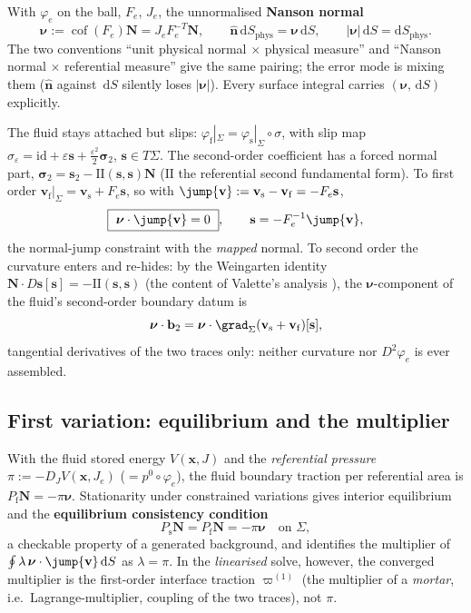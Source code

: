 \documentclass[11pt]{article}
\numberwithin{equation}{section}
\theoremstyle{remark}
\newcommand{\eps}{\varepsilon}
\newcommand{\dS}{\,\mathrm{d}S}
\newcommand{\cof}{\operatorname{cof}}
\newcommand{\vv}{\mathbf{v}}
\newcommand{\vn}{\hat{\mathbf{n}}}
\newcommand{\vN}{\mathbf{N}}
\newcommand{\vs}{\mathbf{s}}
\newcommand{\vx}{\mathbf{x}}
\newcommand{\bnu}{\bm{\nu}}
\begin{document}
With $\varphi_e$ on the ball, $F_e$, $J_e$, the unnormalised \textbf{Nanson
normal}
\begin{equation}
  \bnu := \cof(F_e)\vN = J_eF_e^{-T}\vN, \qquad
  \vn\,\mathrm{d}S_{\mathrm{phys}} = \bnu\dS, \qquad
  |\bnu|\dS = \mathrm{d}S_{\mathrm{phys}} .
\end{equation}
The two conventions ``unit physical normal $\times$ physical measure'' and
``Nanson normal $\times$ referential measure'' give the same pairing; the
error mode is mixing them ($\vn$ against $\dS$ silently loses $|\bnu|$).
Every surface integral carries $(\bnu,\dS)$ explicitly.

The fluid stays attached but slips: $\varphi_{\mathrm{f}}|_\Sigma =
\varphi_{\mathrm{s}}|_\Sigma\circ\sigma$, with slip map $\sigma_\eps =
\mathrm{id} + \eps\vs + \tfrac{\eps^2}{2}\bm{\sigma}_2$, $\vs\in T\Sigma$.
The second-order coefficient has a forced normal part,
$\bm{\sigma}_2 = \vs_2 - \mathrm{II}(\vs,\vs)\vN$ ($\mathrm{II}$ the
referential second fundamental form). To first order $\vv_{\mathrm{f}}
|_\Sigma = \vv_{\mathrm{s}} + F_e\vs$, so with $\jump{\vv} :=
\vv_{\mathrm{s}} - \vv_{\mathrm{f}} = -F_e\vs$,
\begin{equation}
  \boxed{\ \bnu\cdot\jump{\vv} = 0\ }, \qquad \vs = -F_e^{-1}\jump{\vv},
  \label{eq:constraint}
\end{equation}
the normal-jump constraint with the \emph{mapped} normal. To second order
the curvature enters and re-hides: by the Weingarten identity
$\vN\cdot D\vs[\vs] = -\mathrm{II}(\vs,\vs)$ (the content of Valette's analysis
\cite{Valette1986,Valette1991}), the $\bnu$-component of the fluid's
second-order boundary datum is
\begin{equation}
  \bnu\cdot\mathbf{b}_2 = \bnu\cdot\grad_\Sigma(\vv_{\mathrm{s}}
     + \vv_{\mathrm{f}})[\vs],
\end{equation}
tangential derivatives of the two traces only: neither curvature nor
$D^2\varphi_e$ is ever assembled.

\subsection{First variation: equilibrium and the multiplier}

With the fluid stored energy $V(\vx,J)$ and the \emph{referential pressure}
$\pi := -D_JV(\vx,J_e)$ ($= p^0\circ\varphi_e$), the fluid boundary
traction per referential area is $P_{\mathrm{f}}\vN = -\pi\bnu$.
Stationarity under constrained variations gives interior equilibrium and
the \textbf{equilibrium consistency condition}
\begin{equation}
  P_{\mathrm{s}}\vN = P_{\mathrm{f}}\vN = -\pi\bnu \quad\text{on }\Sigma,
\end{equation}
a checkable property of a generated background, and identifies the
multiplier of $\oint\lambda\,\bnu\cdot\jump{\vv}\dS$ as $\lambda = \pi$. In
the \emph{linearised} solve, however, the converged multiplier is the
first-order interface traction $\varpi^{(1)}$ (the multiplier of a
\emph{mortar}, i.e.\ Lagrange-multiplier, coupling of the two traces), not
$\pi$.
\end{document}
